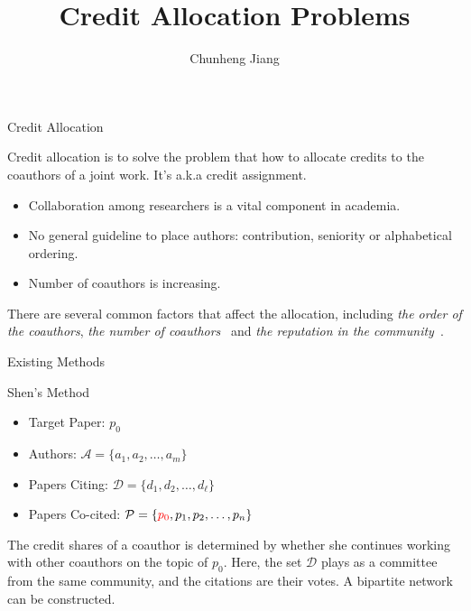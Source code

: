\documentclass{beamer}
\title[]{Credit Allocation Problems}
\author[Chunheng Jiang, Ph.D in Computer Science]{Chunheng Jiang}
\date{}
\begin{document}
\begin{frame}
\titlepage
\end{frame}

\begin{frame}{Credit Allocation}
\begin{block}{}
Credit allocation is to solve the problem that how to allocate credits to the coauthors of a joint work.
It's a.k.a credit assignment.

\begin{itemize}
\item Collaboration among researchers is a vital component in academia.
\item No general guideline to place authors: contribution, seniority or alphabetical ordering.
\item Number of coauthors is increasing.
\end{itemize}

There are several common factors that affect the allocation, including \textit{the order of the coauthors}, \textit{the number of coauthors}~\cite{xu2016author} and \textit{the reputation in the community}~\cite{shen2014collective,bao2017dynamic}.
\end{block}
\end{frame}

\begin{frame}{Existing Methods}
\end{frame}

\begin{frame}{Shen's Method}
\begin{block}{}
\begin{itemize}
\item Target Paper: $p_0$
\item Authors: $\mathcal A=\{a_1,a_2,\ldots,a_m\}$
\item Papers Citing: $\mathcal D=\{d_1,d_2,\ldots,d_\ell\}$
\item Papers Co-cited: $\mathcal P=\{\textcolor{red}{p_0},p_1,p_2,\ldots,p_n\}$
\end{itemize}

The credit shares of a coauthor is determined by whether she continues working with other coauthors on the topic of $p_0$. Here, the set $\mathcal D$ plays as a committee from the same community, and the citations are their votes. A bipartite network can be constructed. 
\end{block}
\end{frame}
\end{document}
